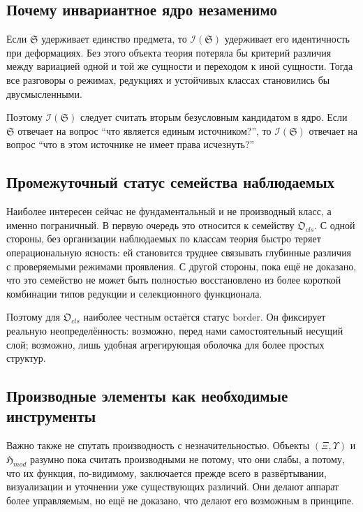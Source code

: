 \documentclass[12pt,a4paper]{article}
\begin{document}
\subsection{Почему инвариантное ядро незаменимо}

Если \(\mathfrak{S}\) удерживает единство предмета, то \(\mathcal{I}(\mathfrak{S})\) удерживает его идентичность при деформациях. Без этого объекта теория потеряла бы критерий различия между вариацией одной и той же сущности и переходом к иной сущности. Тогда все разговоры о режимах, редукциях и устойчивых классах становились бы двусмысленными.

Поэтому \(\mathcal{I}(\mathfrak{S})\) следует считать вторым безусловным кандидатом в ядро. Если \(\mathfrak{S}\) отвечает на вопрос ``что является единым источником?'', то \(\mathcal{I}(\mathfrak{S})\) отвечает на вопрос ``что в этом источнике не имеет права исчезнуть?''

\subsection{Промежуточный статус семейства наблюдаемых}

Наиболее интересен сейчас не фундаментальный и не производный класс, а именно пограничный. В первую очередь это относится к семейству \(\mathfrak{O}_{cls}\). С одной стороны, без организации наблюдаемых по классам теория быстро теряет операциональную ясность: ей становится труднее связывать глубинные различия с проверяемыми режимами проявления. С другой стороны, пока ещё не доказано, что это семейство не может быть полностью восстановлено из более короткой комбинации типов редукции и селекционного функционала.

Поэтому для \(\mathfrak{O}_{cls}\) наиболее честным остаётся статус \(\mathrm{border}\). Он фиксирует реальную неопределённость: возможно, перед нами самостоятельный несущий слой; возможно, лишь удобная агрегирующая оболочка для более простых структур.

\subsection{Производные элементы как необходимые инструменты}

Важно также не спутать производность с незначительностью. Объекты \((\Xi,\Upsilon)\) и \(\mathfrak{H}_{mod}\) разумно пока считать производными не потому, что они слабы, а потому, что их функция, по-видимому, заключается прежде всего в развёртывании, визуализации и уточнении уже существующих различий. Они делают аппарат более управляемым, но ещё не доказано, что делают его возможным в принципе.
\end{document}

